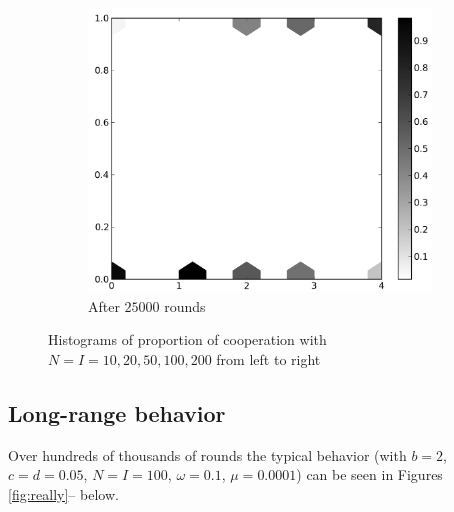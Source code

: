 \documentclass{amsart}
\begin{document}
\begin{figure}[h!tbp]
\begin{subfigure}{.31\linewidth}
    \label{fig:varyN12500}
  \end{subfigure}
  \hspace{.01\linewidth}
  \begin{subfigure}{.31\linewidth}
    \centering
    \includegraphics[width=\linewidth]{varyN25000.png}
    \caption{After $25000$ rounds}
    \label{fig:varyN25000}
  \end{subfigure}
  \caption{Histograms of proportion of cooperation with
    $N=I=10,20,50,100,200$ from left to right}
\end{figure}

\subsection{Long-range behavior}
\label{sec:longrange}
Over hundreds of thousands of rounds the typical behavior (with $b=2$,
$c = d = 0.05$, $N = I = 100$, $\omega = 0.1$, $\mu = 0.0001$) can be
seen in Figures \ref{fig:really}-- below.
\end{document}
